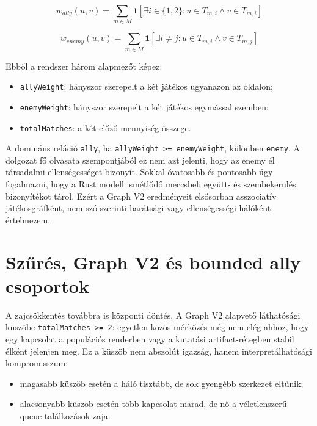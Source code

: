 ﻿\documentclass[a4paper,12pt]{report}
\begin{document}
\begin{equation}
w_{ally}(u,v)=\sum_{m \in M}\mathbf{1}[\exists i \in \{1,2\}: u \in T_{m,i} \land v \in T_{m,i}]
\end{equation}

\begin{equation}
w_{enemy}(u,v)=\sum_{m \in M}\mathbf{1}[\exists i \neq j: u \in T_{m,i} \land v \in T_{m,j}]
\end{equation}

Ebből a rendszer három alapmezőt képez:

\begin{itemize}
    \item \texttt{allyWeight}: hányszor szerepelt a két játékos ugyanazon az oldalon;
    \item \texttt{enemyWeight}: hányszor szerepelt a két játékos egymással szemben;
    \item \texttt{totalMatches}: a két előző mennyiség összege.
\end{itemize}

A domináns reláció \texttt{ally}, ha \texttt{allyWeight >= enemyWeight}, különben \texttt{enemy}. A dolgozat fő olvasata szempontjából ez nem azt jelenti, hogy az enemy él társadalmi ellenségességet bizonyít. Sokkal óvatosabb és pontosabb úgy fogalmazni, hogy a Rust modell ismétlődő meccsbeli együtt- és szembekerülési bizonyítékot tárol. Ezért a Graph V2 eredményeit elsősorban asszociatív játékosgráfként, nem szó szerinti barátsági vagy ellenségességi hálóként értelmezem.

\section{Szűrés, Graph V2 és bounded ally csoportok}

A zajcsökkentés továbbra is központi döntés. A Graph V2 alapvető láthatósági küszöbe \texttt{totalMatches >= 2}: egyetlen közös mérkőzés még nem elég ahhoz, hogy egy kapcsolat a populációs renderben vagy a kutatási artifact-rétegben stabil élként jelenjen meg. Ez a küszöb nem abszolút igazság, hanem interpretálhatósági kompromisszum:

\begin{itemize}
    \item magasabb küszöb esetén a háló tisztább, de sok gyengébb szerkezet eltűnik;
    \item alacsonyabb küszöb esetén több kapcsolat marad, de nő a véletlenszerű queue-találkozások zaja.
\end{itemize}
\end{document}
